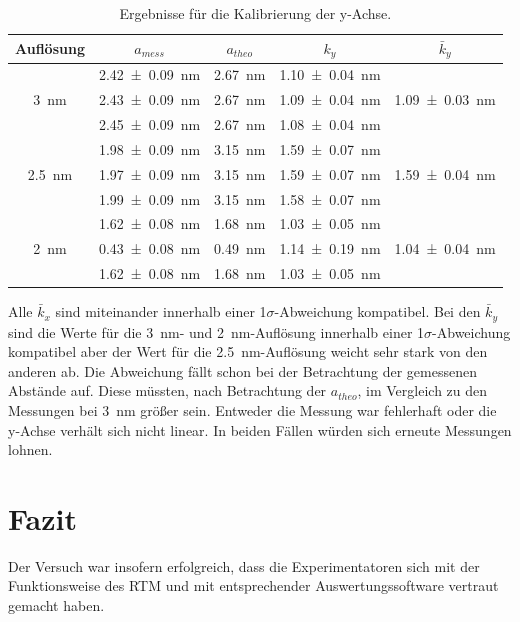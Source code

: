 \begin{table}[H]
	\renewcommand{\arraystretch}{1.5}
	\centering
	\begin{tabular}{|c|c|c|c|c|}
		\hline
		Auflösung & $a_{mess}$ & $a_{theo}$ & $k_y$ & $\bar{k}_y$ \\
		\hline
		\multirow{3}{*}{\SI{3}{nm}} & \SI{2.42+-0.09}{nm} & \SI{2.67}{nm} & \SI{1.10+-0.04}{nm} & \multirow{3}{*}{\SI{1.09+-0.03}{nm}} \\
		 & \SI{2.43+-0.09}{nm} & \SI{2.67}{nm} & \SI{1.09+-0.04}{nm} & \\
		 & \SI{2.45+-0.09}{nm} & \SI{2.67}{nm} & \SI{1.08+-0.04}{nm} & \\
		\hline
		\multirow{3}{*}{\SI{2,5}{nm}} & \SI{1.98+-0.09}{nm} & \SI{3.15}{nm} & \SI{1.59+-0.07}{nm} & \multirow{3}{*}{\SI{1.59+-0.04}{nm}} \\
		 & \SI{1.97+-0.09}{nm} & \SI{3.15}{nm} & \SI{1.59+-0.07}{nm} & \\
		 & \SI{1.99+-0.09}{nm} & \SI{3.15}{nm} & \SI{1.58+-0.07}{nm} & \\
		\hline
		\multirow{3}{*}{\SI{2}{nm}} & \SI{1.62+-0.08}{nm} & \SI{1.68}{nm} & \SI{1.03+-0.05}{nm} & \multirow{3}{*}{\SI{1.04+-0.04}{nm}} \\
		 & \SI{0.43+-0.08}{nm} & \SI{0.49}{nm} & \SI{1.14+-0.19}{nm} & \\
		 & \SI{1.62+-0.08}{nm} & \SI{1.68}{nm} & \SI{1.03+-0.05}{nm} & \\
		\hline
	\end{tabular}
	\caption{Ergebnisse für die Kalibrierung der y-Achse.}
	\label{tab:calibY}
\end{table}

Alle $\bar{k}_x$ sind miteinander innerhalb einer 1$\sigma$-Abweichung kompatibel. Bei den $\bar{k}_y$ sind die Werte für die \SI{3}{nm}- und \SI{2}{nm}-Auflösung innerhalb einer 1$\sigma$-Abweichung kompatibel aber der Wert für die \SI{2,5}{nm}-Auflösung weicht sehr stark von den anderen ab. Die Abweichung fällt schon bei der Betrachtung der gemessenen Abstände auf. Diese müssten, nach Betrachtung der $a_{theo}$, im Vergleich zu den Messungen bei \SI{3}{nm} größer sein. Entweder die Messung war fehlerhaft oder die y-Achse verhält sich nicht linear. In beiden Fällen würden sich erneute Messungen lohnen.


\section{Fazit}

Der Versuch war insofern erfolgreich, dass die Experimentatoren sich mit der Funktionsweise des RTM und mit entsprechender Auswertungssoftware vertraut gemacht haben.

